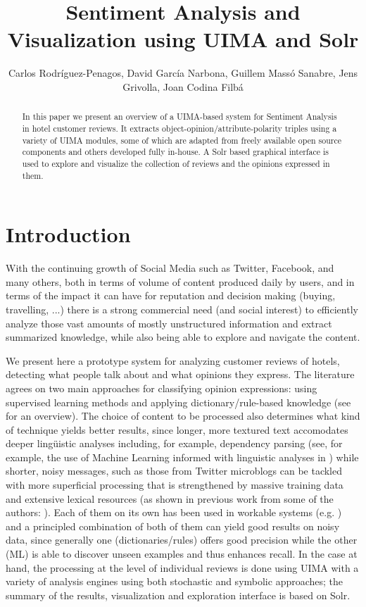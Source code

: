 \documentclass{llncs}
\title{Sentiment Analysis and Visualization using UIMA and Solr}
\author{Carlos Rodríguez-Penagos, David García Narbona, Guillem Massó Sanabre, Jens Grivolla, Joan Codina Filbá}
\institute{Barcelona Media Innovation Centre}
\begin{document}
\maketitle

\begin{abstract}
In this paper we present an overview of a UIMA-based system for Sentiment Analysis in hotel customer reviews. It extracts object-opinion/attribute-polarity triples using a variety of UIMA modules, some of which are adapted from freely available open source components and others developed fully in-house. A Solr based graphical interface is used to explore and visualize the collection of reviews and the opinions expressed in them.
\end{abstract}

\section{Introduction}

With the continuing growth of Social Media such as Twitter, Facebook, and many others, both in terms of volume of content produced daily by users, and in terms of the impact it can have for reputation and decision making (buying, travelling, ...) there is a strong commercial need (and social interest) to efficiently analyze those vast amounts of mostly unstructured information and extract summarized knowledge, while also being able to explore and navigate the content.

We present here a prototype system for analyzing customer reviews of hotels, detecting what people talk about and what opinions they express. The literature agrees on two main approaches for classifying opinion expressions: using supervised learning methods and applying dictionary/rule-based knowledge (see \cite{liu_sentiment_2012} for an overview). The choice of content to be processed also determines what kind of technique yields better results, since longer, more textured text accomodates deeper lingüistic analyses including, for example, dependency parsing (see, for example, the use of Machine Learning informed with linguistic analyses in \cite{wilson_recognizing_2010}) while shorter, noisy messages, such as those from Twitter microblogs can be tackled with more superficial processing that is strengthened by massive training data and extensive lexical resources (as shown in previous work from some of the authors: \cite{chenlo_fbm-yahoo!_2012,rodriguez-penagos_fbm:_2013}). Each of them on its own has been used in workable systems (e.g. \cite{zhang_combining_2011}) and a principled combination of both of them can yield good results on noisy data, since generally one (dictionaries/rules) offers good precision while the other (ML) is able to discover unseen examples and thus enhances recall. In the case at hand, the processing at the level of individual reviews is done using UIMA with a variety of analysis engines using both stochastic and symbolic approaches; the summary of the results, visualization and exploration interface is based on Solr.
\end{document}

